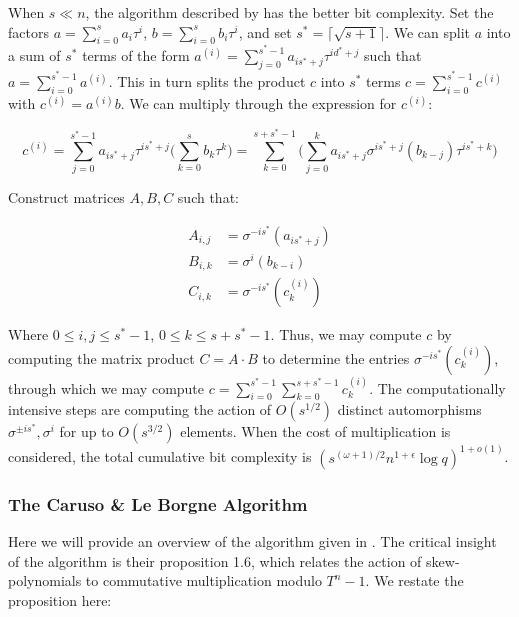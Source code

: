 When $s \ll n$, the algorithm described by \cite[Th.7]{PUCHINGER2017b} has the better bit complexity. Set the factors $a = \sum_{i=0}^s a_i \tau^i$, $b = \sum_{i=0}^s b_i \tau^i $, and set $s^* = \lceil \sqrt{s + 1} \rceil $. We can split $a$ into a sum of $s^*$ terms of the form $a^{(i)} = \sum_{j=0}^{s^* - 1} a_{is^* + j}\tau^{id^* + j}$ such that $a = \sum_{i=0}^{s^* - 1} a^{(i)}$. This in turn splits the product $c$ into $s^*$ terms $c = \sum_{i=0}^{s^* - 1} c^{(i)}$ with $c^{(i)} = a^{(i)}b$. We can multiply through the expression for $c^{(i)}$:

\begin{equation*}
    c^{(i)} = \sum_{j=0}^{s^* - 1} a_{is^* + j}\tau^{is^* + j} \bigg( \sum_{k = 0}^{s} b_k \tau^k \bigg) = \sum_{k=0}^{s + s^* - 1} \bigg( \sum_{j=0}^{k} a_{is^* +j}\sigma^{is^* + j}(b_{k -j})\tau^{is^* + k} \bigg) 
\end{equation*}

Construct matrices $A, B, C$ such that:

\begin{align*}
    A_{i,j} & = \sigma^{-is^*}(a_{is^* + j}) \\
    B_{i,k} & = \sigma^{i}(b_{k-i}) \\
    C_{i,k} & = \sigma^{-is^*}(c_k^{(i)})
\end{align*}

Where $0 \leq i,j \leq s^* -1$, $0 \leq k \leq s + s^* - 1 $. Thus, we may compute $c$ by computing the matrix product $C = A \cdot B$ to determine the entries $\sigma^{-is^*}(c_k^{(i)})$, through which we may compute $c = \sum_{i = 0}^{s^* - 1}\sum_{k = 0}^{s + s^* - 1} c_k^{(i)}$. The computationally intensive steps are computing the action of $O(s^{1/2})$ distinct automorphisms $\sigma^{\pm is^*}, \sigma^i$ for up to $O(s^{3/2})$ elements. When the cost of multiplication is considered, the total cumulative bit complexity is $(s^{(\omega + 1)/2} n^{1 + \epsilon} \log q)^{1 + o(1)}$.

\subsubsection{The Caruso \& Le Borgne Algorithm}

Here we will provide an overview of the algorithm given in \cite[Sec.2]{CaLe17}. The critical insight of the algorithm is their proposition 1.6, which relates the action of skew-polynomials to commutative multiplication modulo $T^n - 1$. We restate the proposition here:

